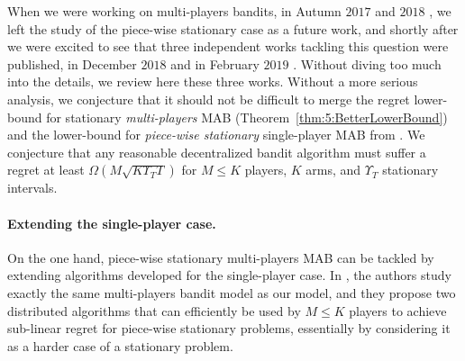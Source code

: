 When we were working on multi-players bandits, in Autumn $2017$ and $2018$ \cite{Besson2018ALT}, we left the study of the piece-wise stationary case as a future work, and shortly after we were excited to see that three independent works tackling this question were published, in December $2018$ \cite{WeiSrivastava18Distributed} and in February $2019$ \cite{AlaturLevyKrause19,bande2019adversarial}.
Without diving too much into the details, we review here these three works.
Without a more serious analysis, we conjecture that it should not be difficult to merge the regret lower-bound for stationary \emph{multi-players} MAB (Theorem~\ref{thm:5:BetterLowerBound}) and the lower-bound for \emph{piece-wise stationary} single-player MAB from \cite{Garivier11UCBDiscount}.
We conjecture that any reasonable decentralized bandit algorithm must suffer a regret at least $\Omega(M \sqrt{K \Upsilon_T T})$ for $M \leq K$ players, $K$ arms, and $\Upsilon_T$ stationary intervals.


\paragraph{Extending the single-player case.}
%
On the one hand, piece-wise stationary multi-players MAB can be tackled by extending algorithms developed for the single-player case.
In \cite{WeiSrivastava18Distributed}, the authors study exactly the same multi-players bandit model as our model, and they propose two distributed algorithms that can efficiently be used by $M \leq K$ players to achieve sub-linear regret for piece-wise stationary problems, essentially by considering it as a harder case of a stationary problem.


